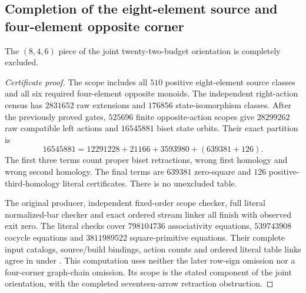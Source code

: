 \subsection{Completion of the eight-element source and four-element opposite corner}

\begin{proposition}
\label{CP2:A-oriented-eighteen-eight-four-six}
The $(8,4,6)$ piece of the joint twenty-two-budget orientation is
completely excluded.
\end{proposition}
\begin{proof}[Certificate proof]
The scope includes all $510$ positive eight-element source classes and
all six required four-element opposite monoids.  The independent
right-action census has $2831652$ raw extensions and $176856$
state-isomorphism classes.  After the previously proved gates,
$525696$ finite opposite-action scopes give $28299262$ raw compatible
left actions and $16545881$ biset state orbits.  Their exact partition is
\[
 16545881=12291228+21166+3593980+(639381+126).
\]
The first three terms count proper biset retractions, wrong first
homology and wrong second homology.  The final terms are $639381$
zero-square and $126$ positive-third-homology literal certificates.
There is no unexcluded table.

The original producer, independent fixed-order scope checker, full
literal normalized-bar checker and exact ordered stream linker all
finish with observed exit zero.  The literal checks cover $798104736$
associativity equations, $539743908$ cocycle equations and $3811989522$
square-primitive equations.  Their complete input catalogs, source/build
bindings, action counts and ordered literal table links agree in
 under
.
This computation uses neither the later row-sign omission nor a
four-corner graph-chain omission.  Its scope is the stated component
of the joint orientation, with the completed seventeen-arrow retraction
obstruction.
\end{proof}
